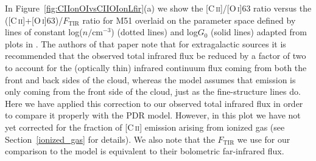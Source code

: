 In Figure~\ref{fig:CIIonOIvsCIIOIonLfir}(a) we show the [C\,\textsc{ii}]/[O\,\textsc{i}]63 ratio versus the ([C\,\textsc{ii}]+[O\,\textsc{i}]63)/$F_{\mathrm{TIR}}$ ratio for M51 overlaid on the parameter space defined by lines of constant log($n/\mathrm{cm}^{-3}$) (dotted lines) and log$G_{0}$ (solid lines) adapted from plots in \citet{1999ApJ...527..795K}.  The authors of that paper note that for extragalactic sources it is recommended that the observed total infrared flux be reduced by a factor of two to account for the (optically thin) infrared continuum flux coming from both the front and back sides of the cloud, whereas the model assumes that emission is only coming from the front side of the cloud, just as the fine-structure lines do.  Here we have applied this correction to our observed total infrared flux in order to compare it properly with the PDR model.  However, in this plot we have not yet corrected for the fraction of [C\,\textsc{ii}] emission arising from ionized gas (see Section~\ref{ionized_gas} for details).  We also note that the $F_{\mathrm{TIR}}$ we use for our comparison to the \citet{1999ApJ...527..795K} model is equivalent to their bolometric far-infrared flux.

